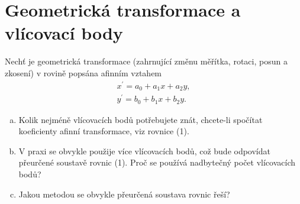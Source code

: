 \section{Geometrická transformace a vlícovací body}
Nechť je geometrická transformace (zahrnující změnu měřítka, rotaci, posun a zkosení) v rovině popsána afinním vztahem
\begin{align}
    x^{\prime}=a_{0}+a_{1}x+a_{2}y, \\
    y^{\prime}=b_{0}+b_{1}x+b_{2}y.
\end{align}
\begin{enumerate}[a)]
    \item Kolik nejméně vlícovacích bodů potřebujete znát, chcete-li spočítat koeficienty afinní transformace, viz 
    rovnice (1).
    \item V praxi se obvykle použije více vlícovacích bodů, což bude odpovídat přeurčené soustavě rovnic (1). Proč se 
    používá nadbytečný počet vlícovacích bodů?
    \item Jakou metodou se obvykle přeurčená soustava rovnic řeší?
\end{enumerate}
